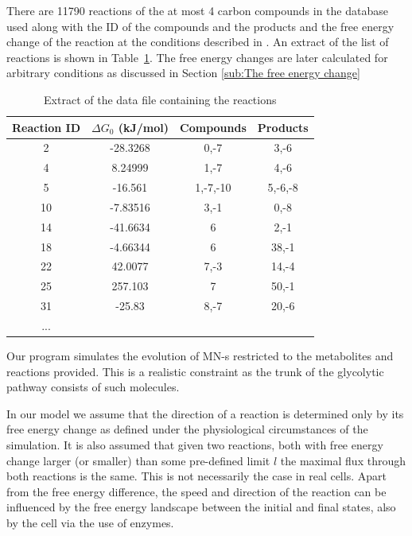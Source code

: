 \documentclass[a4paper,12pt]{article}
\begin{document}
	There are 11790 reactions of the at most 4 carbon compounds in the database used along with the ID of the compounds and the products and the free energy change of the reaction at the conditions described in \cite{BartekLower}. An extract of the list of reactions is shown in Table~\ref{tab:reacs}. The free energy changes are later calculated for arbitrary conditions as discussed in Section \ref{sub:The free energy change}

	\begin{table}[htpb]
		\centering
		\begin{tabular}{cccc}
		Reaction ID &	$\Delta G_0$ (kJ/mol) & Compounds & Products \\ \hline
		2 &	-28.3268           & 0,-7      & 3,-6     \\
		4 &	8.24999            & 1,-7      & 4,-6     \\
		5 &	-16.561            & 1,-7,-10  & 5,-6,-8  \\
		10 &	-7.83516           & 3,-1      & 0,-8     \\
		14 &	-41.6634           & 6         & 2,-1     \\
		18 &	-4.66344           & 6         & 38,-1    \\
		22 &	42.0077            & 7,-3      & 14,-4    \\
		25 &	257.103            & 7         & 50,-1    \\
		31 &	-25.83             & 8,-7      & 20,-6    \\
		...&           &         
		\end{tabular}
		\caption{Extract of the data file containing the reactions}
		\label{tab:reacs}
	\end{table}
	
	Our program simulates the evolution of MN-s restricted to the metabolites and reactions provided. This is a realistic constraint as the trunk of the glycolytic pathway consists of such molecules.

	In our model we assume that the direction of a reaction is determined only by its free energy change as defined under the physiological circumstances of the simulation. It is also assumed that given two reactions, both with free energy change larger (or smaller) than some pre-defined limit $l$ the maximal flux through both reactions is the same. This is not necessarily the case in real cells. Apart from the free energy difference, the speed and direction of the reaction can be influenced by the free energy landscape between the initial and final states, also by the cell via the use of enzymes. 
\end{document}
